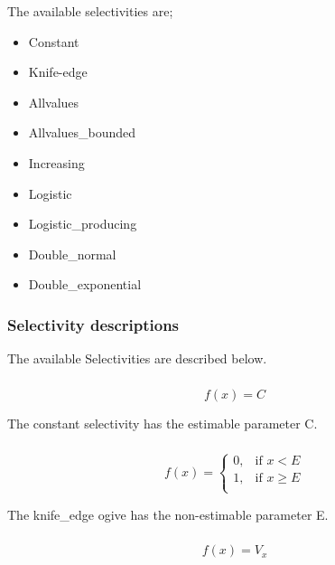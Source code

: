 The available selectivities are;

\begin{itemize}
  \item Constant
  \item Knife-edge
  \item Allvalues
  \item Allvalues\_bounded
  \item Increasing
  \item Logistic
  \item Logistic\_producing
  \item Double\_normal
  \item Double\_exponential
\end{itemize}

\subsubsection{Selectivity descriptions}

The available Selectivities are described below.

\subsubsection*{}

\begin{equation}
f(x)=C
\end{equation}

The constant selectivity has the estimable parameter C. 

\subsubsection*{}

\begin{equation}
f(x)= \begin{cases}
  0, & \text{if $x < E$} \\
  1, & \text{if $x \ge E$}\\ 
  \end{cases} 
\end{equation}

The knife\_edge ogive has the non-estimable parameter E.

\subsubsection*{}

\begin{equation}
f(x)=V_x
\end{equation}

